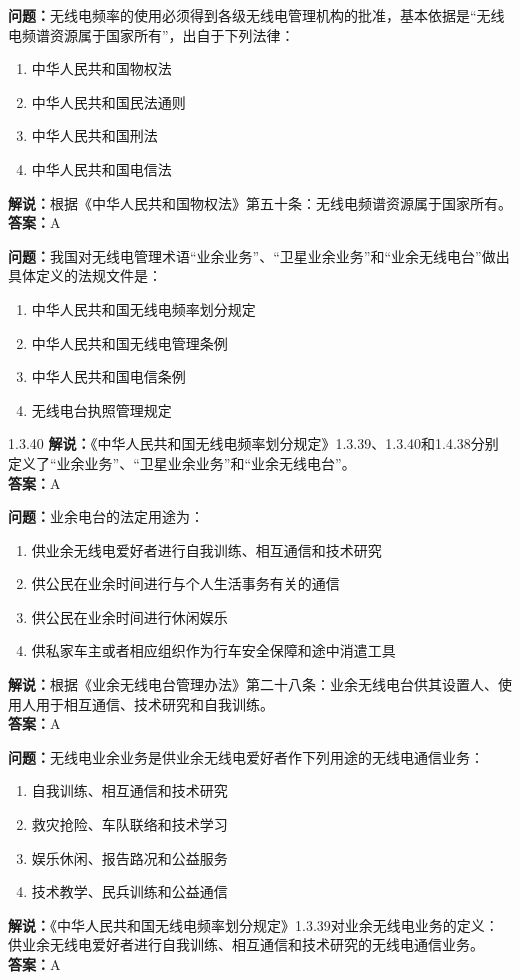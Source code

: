 \documentclass{ctexbook}%
\begin{document}
\textbf{问题：}无线电频率的使用必须得到各级无线电管理机构的批准，基本依据是“无线电频谱资源属于国家所有”，出自于下列法律：
\begin{enumerate}[label=\Alph*), leftmargin=3em]
\item 中华人民共和国物权法
\item 中华人民共和国民法通则
\item 中华人民共和国刑法
\item 中华人民共和国电信法
\end{enumerate}
\textbf{解说：}根据《中华人民共和国物权法》第五十条：无线电频谱资源属于国家所有。\\
\textbf{答案：}A

\textbf{问题：}我国对无线电管理术语“业余业务”、“卫星业余业务”和“业余无线电台”做出具体定义的法规文件是：
\begin{enumerate}[label=\Alph*), leftmargin=3em]
\item 中华人民共和国无线电频率划分规定
\item 中华人民共和国无线电管理条例
\item 中华人民共和国电信条例
\item 无线电台执照管理规定
\end{enumerate}1.3.40
\textbf{解说：}《中华人民共和国无线电频率划分规定》1.3.39、1.3.40和1.4.38分别定义了“业余业务”、“卫星业余业务”和“业余无线电台”。\\
\textbf{答案：}A

\textbf{问题：}业余电台的法定用途为：
\begin{enumerate}[label=\Alph*), leftmargin=3em]
\item 供业余无线电爱好者进行自我训练、相互通信和技术研究
\item 供公民在业余时间进行与个人生活事务有关的通信
\item 供公民在业余时间进行休闲娱乐
\item 供私家车主或者相应组织作为行车安全保障和途中消遣工具
\end{enumerate}
\textbf{解说：}根据《业余无线电台管理办法》第二十八条：业余无线电台供其设置人、使用人用于相互通信、技术研究和自我训练。\\
\textbf{答案：}A

\textbf{问题：}无线电业余业务是供业余无线电爱好者作下列用途的无线电通信业务：
\begin{enumerate}[label=\Alph*), leftmargin=3em]
\item 自我训练、相互通信和技术研究
\item 救灾抢险、车队联络和技术学习
\item 娱乐休闲、报告路况和公益服务
\item 技术教学、民兵训练和公益通信
\end{enumerate}
\textbf{解说：}《中华人民共和国无线电频率划分规定》1.3.39对业余无线电业务的定义：供业余无线电爱好者进行自我训练、相互通信和技术研究的无线电通信业务。\\
\textbf{答案：}A
\end{document}
